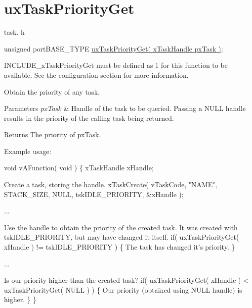 \hypertarget{group__ux_task_priority_get}{\section{ux\-Task\-Priority\-Get}
\label{group__ux_task_priority_get}
}
task. h 
\begin{DoxyPre}unsigned portBASE\_TYPE \hyperlink{win32_2win32_2_libraries_2_free_r_t_o_s_2_source_2tasks_8c_a78c9194ad844cc44a0c033bb863939ef}{uxTaskPriorityGet( xTaskHandle pxTask )};\end{DoxyPre}


I\-N\-C\-L\-U\-D\-E\-\_\-x\-Task\-Priority\-Get must be defined as 1 for this function to be available. See the configuration section for more information.

Obtain the priority of any task.


\begin{DoxyParams}{Parameters}
{\em px\-Task} & Handle of the task to be queried. Passing a N\-U\-L\-L handle results in the priority of the calling task being returned.\\
\hline
\end{DoxyParams}
\begin{DoxyReturn}{Returns}
The priority of px\-Task.
\end{DoxyReturn}
Example usage\-: 
\begin{DoxyPre}
 void vAFunction( void )
 \{
 xTaskHandle xHandle;\end{DoxyPre}



\begin{DoxyPre}Create a task, storing the handle.
         xTaskCreate( vTaskCode, "NAME", STACK\_SIZE, NULL, tskIDLE\_PRIORITY, \&xHandle );\end{DoxyPre}



\begin{DoxyPre}...\end{DoxyPre}



\begin{DoxyPre}Use the handle to obtain the priority of the created task.
It was created with tskIDLE\_PRIORITY, but may have changed
it itself.
         if( uxTaskPriorityGet( xHandle ) != tskIDLE\_PRIORITY )
         \{
The task has changed it's priority.
         \}\end{DoxyPre}



\begin{DoxyPre}...\end{DoxyPre}



\begin{DoxyPre}Is our priority higher than the created task?
         if( uxTaskPriorityGet( xHandle ) < uxTaskPriorityGet( NULL ) )
         \{
Our priority (obtained using NULL handle) is higher.
         \}
 \}
   \end{DoxyPre}
 